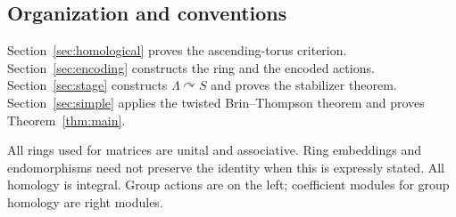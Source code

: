 \subsection{Organization and conventions}

Section~\ref{sec:homological} proves the ascending-torus criterion.
Section~\ref{sec:encoding} constructs the ring and the encoded actions.
Section~\ref{sec:stage} constructs \(\Lambda\curvearrowright S\) and
proves the stabilizer theorem. Section~\ref{sec:simple} applies the
twisted Brin--Thompson theorem and proves Theorem~\ref{thm:main}.

All rings used for matrices are unital and associative. Ring embeddings
and endomorphisms need not preserve the identity when this is expressly
stated. All homology is integral. Group actions are on the left;
coefficient modules for group homology are right modules.
